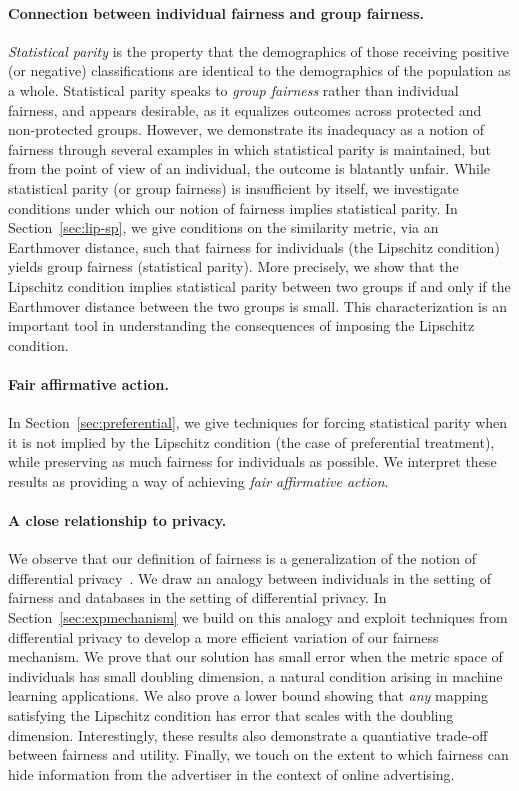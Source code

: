 \documentclass[letterpaper,11pt]{article}
\theoremstyle{definition}
\begin{document}
\paragraph{Connection between individual fairness and group fairness.}
\emph{Statistical parity} is the property that the demographics of those
receiving positive (or negative) classifications are identical to the
demographics of the population as a whole. Statistical parity speaks to
\emph{group fairness} rather than individual fairness, and appears 
desirable, as it equalizes outcomes across protected and non-protected
groups.
However, we demonstrate its inadequacy as
a notion of fairness through several examples in which statistical parity is
maintained, but from the point of view of an individual, the outcome is
blatantly unfair.
While statistical parity (or group fairness) is insufficient by itself, we
investigate conditions under which  our notion of fairness implies
statistical parity.  In Section~\ref{sec:lip-sp}, we give conditions on the
similarity metric, via an Earthmover distance, such that fairness for
individuals (the Lipschitz condition) yields group fairness (statistical
parity). More precisely, we show that the Lipschitz condition implies
statistical parity between two groups if and only if the Earthmover distance
between the two groups is small. This characterization is an important tool in
understanding the consequences of imposing the Lipschitz condition.

\paragraph{Fair affirmative action.}
In Section~\ref{sec:preferential}, we give
techniques for forcing statistical parity when it is not implied by the
Lipschitz condition (the case of preferential treatment), while preserving as
much fairness for individuals as possible. We interpret these results as
providing a way of achieving \emph{fair affirmative action}.

\paragraph{A close relationship to privacy.}
We observe that our definition of fairness is a generalization of the notion
of differential privacy~\cite{Dwork06,DworkMcNiSm06}.  We draw an analogy
between individuals in the setting of fairness and databases in the setting of
differential privacy. In Section~\ref{sec:expmechanism} we build on this
analogy and exploit techniques from differential privacy to develop a more
efficient variation of our fairness mechanism. We prove that our solution has
small error when the metric space of individuals has small doubling dimension,
a natural condition arising in machine learning applications. We also prove a
lower bound showing that \emph{any} mapping satisfying the Lipschitz condition
has error that scales with the doubling dimension. Interestingly, these results 
also demonstrate a quantiative trade-off between fairness and utility.
%
Finally, we touch on the extent to which fairness can 
hide information from the advertiser 
in the context of online advertising.
\end{document}
